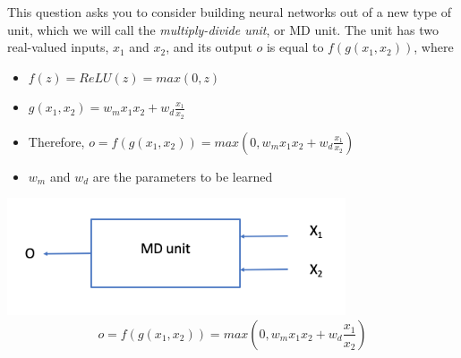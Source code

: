 This question asks you to consider building neural networks out of a new type of unit, which we will call the {\em multiply-divide unit}, or MD unit.  The unit has two real-valued inputs, $x_1$ and $x_2$, and its output $o$ is equal to $f(g(x_1,x_2))$, where

\begin{itemize}
    \item $f(z) = ReLU(z) = max(0,z)$
    \item $g(x_1,x_2) = w_m x_1 x_2 + w_d \frac{x_1}{x_2}$
    \item Therefore, $o = f(g(x_1,x_2)) = max(0, w_m x_1 x_2 + w_d \frac{x_1}{x_2}) $
    \item $w_m$ and $w_d$ are the parameters to be learned
\end{itemize}

\begin{center}
\includegraphics[width=10cm]{figures/MDunit.png}
\[ o = f(g(x_1,x_2)) = max(0, w_m x_1 x_2 + w_d \frac{x_1}{x_2}) \]
\end{center}


